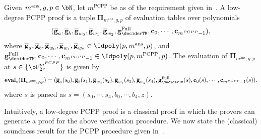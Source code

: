 \begin{definition}
	Given $m^{\text{ans}},g, p \in \bN$, let $m^{\text{PCPP}}$ be as of the requirement given in~. A low-degree PCPP proof is a tuple $\mathbf{\Pi}_{m^{\text{ans}},g, p}$ of evaluation tables over polynomials 
	\begin{equation} \label{eq:PCPPallpolys}
		(\overline{\textbf{g}}_a, \overline{\textbf{g}}_b, \overline{\textbf{g}}_{w_0}, \overline{\textbf{g}}_{w_1},\overline{\textbf{g}}_{w_2}, \textbf{g}_{\deciderTM}^{\text{Full}},  \textbf{c}_0, \cdots,  \textbf{c}_{m^{PCPP} -1}),
	\end{equation}
	where $\overline{\textbf{g}}_a, \overline{\textbf{g}}_b, \overline{\textbf{g}}_{w_0} , \overline{\textbf{g}}_{w_1}, \overline{\textbf{g}}_{w_2} \in \Idpoly(p,m^{\text{ans}},p)$, and $\textbf{g}_{\deciderTM}^{\text{Full}},\textbf{c}_0, \cdots,  \textbf{c}_{m^{PCPP} -1} \in \Idpoly(p,m^{\text{PCPP}},p)$. The evaluation of $\mathbf{\Pi}_{m^{\text{ans}},g, p}$ at $s \in \{\bF_{2^p}^{m^{PCPP}}\}$ is given by 
	\begin{equation*}
		\textbf{eval}_s(\mathbf{\Pi}_{m^{\text{ans}},g, p}) = (\overline{\textbf{g}}_a(s_0), \overline{\textbf{g}}_b(s_1), \overline{\textbf{g}}_{w_0}(s_2), \overline{\textbf{g}}_{w_1}(s_3),\overline{\textbf{g}}_{w_2}(s_4), \textbf{g}_{\deciderTM}^{\text{Full}}(s),  \textbf{c}_0(s), \cdots,  \textbf{c}_{m^{PCPP} -1}(s)). 
	\end{equation*}
	where $s$ is parsed as  $s =(s_0, \cdots, s_4, b_0, \cdots, b_4, z)$. 
\end{definition}
Intuitively, a low-degree PCPP proof is a classical proof in which the provers can generate a proof for the above verification procedure. We now state the (classical) soundness result for the PCPP procedure given in~. 

